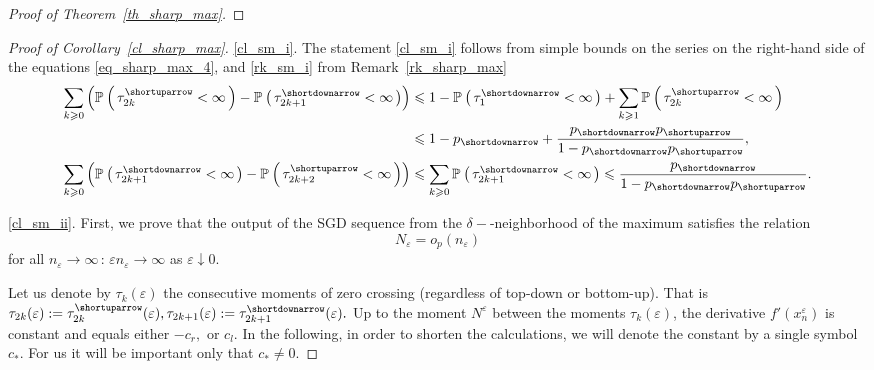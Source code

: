 \documentclass{article}
\theoremstyle{plain}
\theoremstyle{definition}
\theoremstyle{remark}
\newcommand{\p}[2][]{{\mathbb{P}}_{#1} \left( \, #2 \, \right) } %
\newcommand{\ra }{ \rightarrow} %
\begin{document}
\begin{proof}[Proof of Theorem~\ref{th_sharp_max}]
\end{proof}  



\begin{proof}[Proof of Corollary~\ref{cl_sharp_max}]
\ref{cl_sm_i}. The statement \ref{cl_sm_i} follows from simple bounds on the series on the right-hand side of the equations \eqref{eq_sharp_max_4}, and \ref{rk_sm_i} from Remark~\ref{rk_sharp_max}
\begin{equation*}
\begin{split}
 \sum_{k \geqslant 0} \left( \p{  \tau_{2 k}^{\shortuparrow} < \infty} -\p{\tau_{2 k +1}^{\shortdownarrow} <\infty}\right) & \leqslant  1 - \p{\tau_{1}^{\shortdownarrow} <\infty} + \sum_{k \geqslant 1} \p{  \tau_{2 k}^{\shortuparrow} < \infty}  \\ 
& \leqslant 1 - p_{\shortdownarrow} +  \frac{p_{\shortdownarrow} p_{\shortuparrow} }{1- p_{\shortdownarrow} p_{\shortuparrow}},   \\
\sum_{k \geqslant 0} \left( \p{  \tau_{2 k+1}^{\shortdownarrow} < \infty} -\p{\tau_{2 k +2}^{\shortuparrow} <\infty}\right) & \leqslant  \sum_{k \geqslant 0} \p{  \tau_{2 k+1}^{\shortdownarrow} < \infty}  \leqslant \frac{p_{\shortdownarrow} }{1- p_{\shortdownarrow} p_{\shortuparrow}}.
\end{split}
\end{equation*}

\ref{cl_sm_ii}.
First, we prove that the output of the SGD sequence from the $\delta-$-neighborhood of the maximum satisfies the relation
\begin{equation}\label{eq_sharp_max_12}
    N_{\varepsilon} = o_{p}(n_\varepsilon)
\end{equation}
for all $n_{\varepsilon} \ra \infty \, :\,  \varepsilon n_{\varepsilon} \ra \infty$ as $\varepsilon \downarrow 0.$

Let us denote by $\tau_k(\varepsilon)$ the consecutive moments of zero crossing (regardless of top-down or bottom-up). That is $\tau_{2k}(\varepsilon):= \tau^{\shortuparrow}_{2k}(\varepsilon), \tau_{2k+1}(\varepsilon):= \tau^{\shortdownarrow}_{2k+1}(\varepsilon).$ 
Up to the moment $N^{\varepsilon}$ between the moments $\tau_k(\varepsilon)$, the derivative $f'(x_n^{\varepsilon})$ is constant and equals either $-c_r,$ or $c_l$. In the following, in order to shorten the calculations, we will denote the constant by a single symbol $c_*.$ For us it will be important only that $c_* \neq 0.$


\end{proof}
\end{document}
